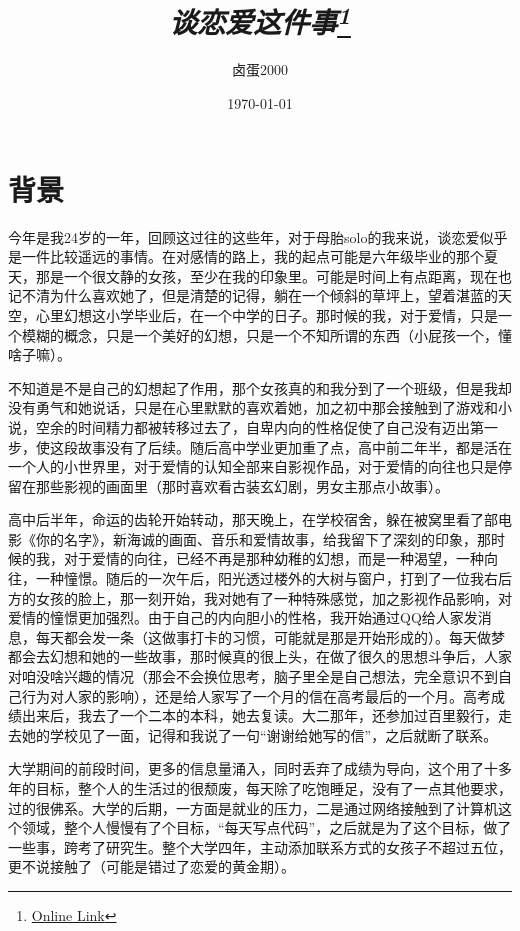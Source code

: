 \documentclass{article}
\title{\textit{谈恋爱这件事\footnote{\href{https://github.com/jiahaoxiang2000/TempWrite/blob/master/think/love.tex}{Online Link}}}}
\author{卤蛋2000}
\date{\today}
\begin{document}
\maketitle

\section{背景}
今年是我24岁的一年，回顾这过往的这些年，对于母胎solo的我来说，谈恋爱似乎是一件比较遥远的事情。在对感情的路上，我的起点可能是六年级毕业的那个夏天，那是一个很文静的女孩，至少在我的印象里。可能是时间上有点距离，现在也记不清为什么喜欢她了，但是清楚的记得，躺在一个倾斜的草坪上，望着湛蓝的天空，心里幻想这小学毕业后，在一个中学的日子。那时候的我，对于爱情，只是一个模糊的概念，只是一个美好的幻想，只是一个不知所谓的东西（小屁孩一个，懂啥子嘛）。

不知道是不是自己的幻想起了作用，那个女孩真的和我分到了一个班级，但是我却没有勇气和她说话，只是在心里默默的喜欢着她，加之初中那会接触到了游戏和小说，空余的时间精力都被转移过去了，自卑内向的性格促使了自己没有迈出第一步，使这段故事没有了后续。随后高中学业更加重了点，高中前二年半，都是活在一个人的小世界里，对于爱情的认知全部来自影视作品，对于爱情的向往也只是停留在那些影视的画面里（那时喜欢看古装玄幻剧，男女主那点小故事）。

高中后半年，命运的齿轮开始转动，那天晚上，在学校宿舍，躲在被窝里看了部电影《你的名字》，新海诚的画面、音乐和爱情故事，给我留下了深刻的印象，那时候的我，对于爱情的向往，已经不再是那种幼稚的幻想，而是一种渴望，一种向往，一种憧憬。随后的一次午后，阳光透过楼外的大树与窗户，打到了一位我右后方的女孩的脸上，那一刻开始，我对她有了一种特殊感觉，加之影视作品影响，对爱情的憧憬更加强烈。由于自己的内向胆小的性格，我开始通过QQ给人家发消息，每天都会发一条（这做事打卡的习惯，可能就是那是开始形成的）。每天做梦都会去幻想和她的一些故事，那时候真的很上头，在做了很久的思想斗争后，人家对咱没啥兴趣的情况（那会不会换位思考，脑子里全是自己想法，完全意识不到自己行为对人家的影响），还是给人家写了一个月的信在高考最后的一个月。高考成绩出来后，我去了一个二本的本科，她去复读。大二那年，还参加过百里毅行，走去她的学校见了一面，记得和我说了一句“谢谢给她写的信”，之后就断了联系。

大学期间的前段时间，更多的信息量涌入，同时丢弃了成绩为导向，这个用了十多年的目标，整个人的生活过的很颓废，每天除了吃饱睡足，没有了一点其他要求，过的很佛系。大学的后期，一方面是就业的压力，二是通过网络接触到了计算机这个领域，整个人慢慢有了个目标，“每天写点代码”，之后就是为了这个目标，做了一些事，跨考了研究生。整个大学四年，主动添加联系方式的女孩子不超过五位，更不说接触了（可能是错过了恋爱的黄金期）。
\end{document}
